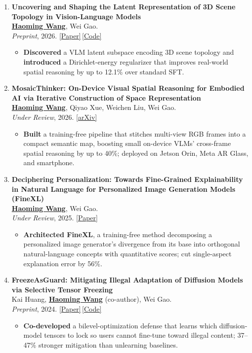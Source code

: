 \documentclass[11pt, letterpaper]{article}
\newenvironment{publist}{
  \begin{enumerate}[leftmargin=1.7em, itemsep=4pt, parsep=0pt, topsep=2pt, label=\arabic*.]
}{
  \end{enumerate}
}
\newcommand{\impactbullet}[1]{%
  \par\vspace{1pt}%
  \begin{itemize}[leftmargin=1.2em, topsep=0pt, itemsep=0pt, parsep=0pt, partopsep=0pt]
    \item #1
  \end{itemize}%
}
\newcommand{\me}{\underline{\textbf{Haoming Wang}}}
\newcommand{\meco}{\underline{\textbf{Haoming Wang}} (co-author)}
\begin{document}
\begin{publist}
\item \textbf{Uncovering and Shaping the Latent Representation of 3D Scene Topology in Vision-Language Models}\\
\me, Wei Gao.\\
\textit{Preprint}, 2026. \href{https://haomingwang645.github.io/pdfs/arxiv26_vlm_latent_shaping.pdf}{[Paper]}\,\href{https://github.com/pittisl/vlm-latent-shaping}{[Code]}
\impactbullet{\textbf{Discovered} a VLM latent subspace encoding 3D scene topology and \textbf{introduced} a Dirichlet-energy regularizer that improves real-world spatial reasoning by up to 12.1\% over standard SFT.}

\item \textbf{MosaicThinker: On-Device Visual Spatial Reasoning for Embodied AI via Iterative Construction of Space Representation}\\
\me, Qiyao Xue, Weichen Liu, Wei Gao.\\
\textit{Under Review}, 2026. \href{https://www.arxiv.org/abs/2602.07082}{[arXiv]}
\impactbullet{\textbf{Built} a training-free pipeline that stitches multi-view RGB frames into a compact semantic map, boosting small on-device VLMs' cross-frame spatial reasoning by up to 40\%; deployed on Jetson Orin, Meta AR Glass, and smartphone.}

\item \textbf{Deciphering Personalization: Towards Fine-Grained Explainability in Natural Language for Personalized Image Generation Models (FineXL)}\\
\me, Wei Gao.\\
\textit{Under Review}, 2025. \href{https://haomingwang645.github.io/pdfs/finexl_paper.pdf}{[Paper]}
\impactbullet{\textbf{Architected FineXL}, a training-free method decomposing a personalized image generator's divergence from its base into orthogonal natural-language concepts with quantitative scores; cut single-aspect explanation error by 56\%.}

\item \textbf{FreezeAsGuard: Mitigating Illegal Adaptation of Diffusion Models via Selective Tensor Freezing}\\
Kai Huang, \meco, Wei Gao.\\
\textit{Preprint}, 2024. \href{https://haomingwang645.github.io/pdfs/freezeasguard_paper.pdf}{[Paper]}\,\href{https://github.com/pittisl/FreezeAsGuard}{[Code]}
\impactbullet{\textbf{Co-developed} a bilevel-optimization defense that learns which diffusion-model tensors to lock so users cannot fine-tune toward illegal content; 37--47\% stronger mitigation than unlearning baselines.}


\end{publist}
\end{document}

